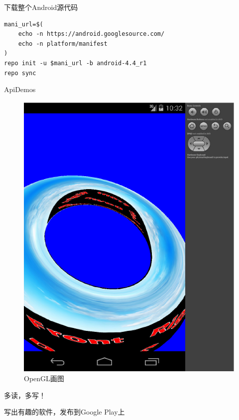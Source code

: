 \documentclass[presentation,dvipdfmx,CJKbookmarks]{beamer}
\begin{document}
\begin{CJK*}{UTF8}{simsun}
\begin{enumerate}
\begin{frame}[fragile,label={sec:orgb7c590a}]{下载整个Android源代码}
\begin{verbatim}
mani_url=$(
    echo -n https://android.googlesource.com/
    echo -n platform/manifest
)
repo init -u $mani_url -b android-4.4_r1
repo sync
\end{verbatim}
\end{frame}
\begin{frame}[label={sec:orga75515f}]{ApiDemos}
\begin{figure}[htbp]
\centering
\includegraphics[width=.5\linewidth]{./images/opengl.ps}
\caption{\label{fig:org9b0feae}
OpenGL画图}
\end{figure}
\end{frame}

\begin{frame}[label={sec:org86ab5b7}]{多读，多写！}
\begin{block}{写出有趣的软件，发布到Google Play上}
\end{block}
\end{frame}
\end{enumerate}
\end{CJK*}
\end{document}

